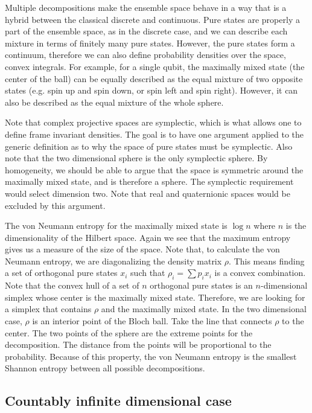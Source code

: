 Multiple decompositions make the ensemble space behave in a way that is a hybrid between the classical discrete and continuous. Pure states are properly a part of the ensemble space, as in the discrete case, and we can describe each mixture in terms of finitely many pure states. However, the pure states form a continuum, therefore we can also define probability densities over the space, convex integrals. For example, for a single qubit, the maximally mixed state (the center of the ball) can be equally described as the equal mixture of two opposite states (e.g. spin up and spin down, or spin left and spin right). However, it can also be described as the equal mixture of the whole sphere.

Note that complex projective spaces are symplectic, which is what allows one to define frame invariant densities. The goal is to have one argument applied to the generic definition as to why the space of pure states must be symplectic. Also note that the two dimensional sphere is the only symplectic sphere. By homogeneity, we should be able to argue that the space is symmetric around the maximally mixed state, and is therefore a sphere. The symplectic requirement would select dimension two. Note that real and quaternionic spaces would be excluded by this argument.

The von Neumann entropy for the maximally mixed state is $\log n$ where $n$ is the dimensionality of the Hilbert space. Again we see that the maximum entropy gives us a measure of the size of the space. Note that, to calculate the von Neumann entropy, we are diagonalizing the density matrix $\rho$. This means finding a set of orthogonal pure states $x_i$ such that $\rho_i = \sum p_i x_i$ is a convex combination. Note that the convex hull of a set of $n$ orthogonal pure states is an $n$-dimensional simplex whose center is the maximally mixed state. Therefore, we are looking for a simplex that contains $\rho$ and the maximally mixed state. In the two dimensional case, $\rho$ is an interior point of the Bloch ball. Take the line that connects $\rho$ to the center. The two points of the sphere are the extreme points for the decomposition. The distance from the points will be proportional to the probability. Because of this property, the von Neumann entropy is the smallest Shannon entropy between all possible decompositions.


\subsection{Countably infinite dimensional case}


